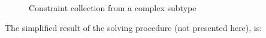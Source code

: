 \begin{figure}[!t]
\caption{Constraint collection from a complex subtype\label{fig:TRef}}
\end{figure}

The simplified result of the solving procedure (not presented here),
is:

\medskip


